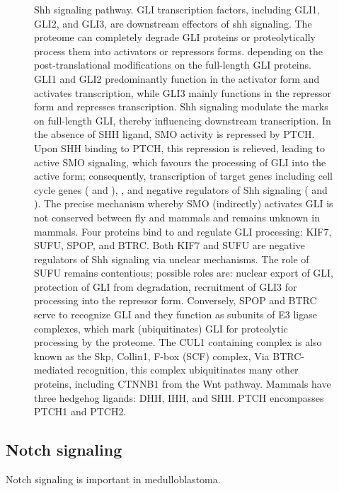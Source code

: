 \begin{figure}[H]
	\begin{center}
	\end{center}
	\caption[\gls{shh} signaling pathway]
	{
		Shh signaling pathway.
		GLI transcription factors, including GLI1, GLI2, and GLI3, are downstream effectors of \gls{shh} signaling. The proteome can completely degrade GLI proteins or proteolytically process them into activators or repressors forms. depending on the post-translational modifications on the full-length GLI proteins. GLI1 and GLI2 predominantly function in the activator form and activates transcription, while GLI3 mainly functions in the repressor form and represses transcription. Shh signaling modulate the marks on full-length GLI, thereby influencing downstream transcription.
		In the absence of SHH ligand, SMO activity is repressed by PTCH. Upon SHH binding to PTCH, this repression is relieved, leading to active SMO signaling, which favours the processing of GLI into the active form; consequently, transcription of target genes including cell cycle genes ( and ), , and negative regulators of Shh signaling ( and ).
		The precise mechanism whereby SMO (indirectly) activates GLI is not conserved between fly and mammals and remains unknown in mammals. Four proteins bind to and regulate GLI processing: KIF7, SUFU, SPOP, and BTRC. Both KIF7 and SUFU are negative regulators of Shh signaling via unclear mechanisms. The role of SUFU remains contentious; possible roles are: nuclear export of GLI, protection of GLI from degradation, recruitment of GLI3 for processing into the repressor form. Conversely, SPOP and BTRC serve to recognize GLI and they function as subunits of E3 ligase complexes, which mark (ubiquitinates) GLI for proteolytic processing by the proteome. The CUL1 containing complex is also known as the Skp, Collin1, F-box (SCF) complex, Via BTRC-mediated recognition, this complex ubiquitinates many other proteins, including CTNNB1 from the Wnt pathway.
		Mammals have three hedgehog ligands: DHH, IHH, and SHH. PTCH encompasses PTCH1 and PTCH2. 
	}
	\label{fig:shh-pathway}
\end{figure}

\subsection{Notch signaling}

Notch signaling is important in medulloblastoma.

